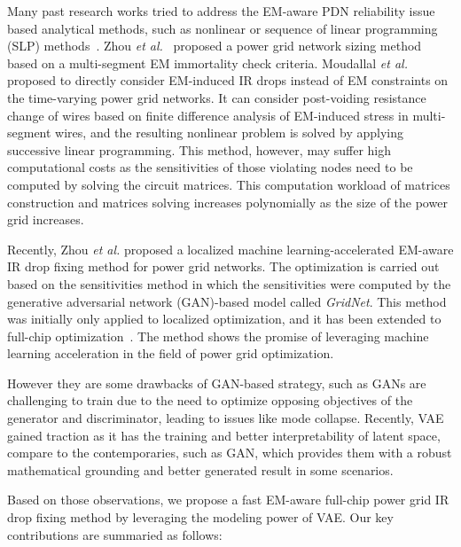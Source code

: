 Many past research works tried to address the EM-aware PDN reliability issue based analytical methods, such as nonlinear or sequence of linear programming (SLP) methods~\cite{ChBr:TCAD'88,DuMa:DAC'89,Tan:DAC'99,Wang:TCAD'05,ZhouSun:TVLSI'19, Sukharev:2019pg, ZhouYu:ASPDAC'20,ZhouJin:ICCAD'20}. Zhou {\it et al.}~\cite{ZhouSun:TVLSI'19,ZhouChen:Integration'21} proposed a power grid network sizing method based on a multi-segment EM immortality check criteria. Moudallal {\it et al.}~\cite{Sukharev:2019pg} proposed to directly consider EM-induced IR drops instead of EM constraints on the time-varying power grid networks. It can consider post-voiding resistance change of wires based on finite difference analysis of EM-induced stress in multi-segment wires, and the resulting nonlinear problem is solved by applying successive linear programming. This method, however, may suffer high computational costs as the sensitivities of those violating nodes need to be computed by solving the circuit matrices. This computation workload of matrices construction and matrices solving increases polynomially as the size of the power grid increases. 
   
Recently, Zhou {\it et al.} proposed a localized machine learning-accelerated EM-aware IR drop fixing method for power grid networks. The optimization is carried out based on the sensitivities method in which the sensitivities were computed by the generative adversarial network (GAN)-based model called {\it GridNet}. This method was initially only applied to localized optimization, and it has been extended to full-chip optimization~\cite{HanLiu:TCAD'22-23}.  The method shows the promise of leveraging machine learning acceleration in the field of power grid optimization.

However they are some drawbacks of GAN-based strategy, such as GANs are challenging to train due to the need to optimize opposing objectives of the generator and discriminator, leading to issues like mode collapse. Recently,  VAE  \cite{Diederik:arxiv'22} gained traction as it has the training and better interpretability of latent space, compare to the contemporaries, such as GAN, which provides them with a robust mathematical grounding and better generated result in some scenarios. 

Based on those observations, we propose a fast EM-aware full-chip power grid IR drop fixing method by leveraging the modeling power of VAE. Our key contributions are summaried as follows:

